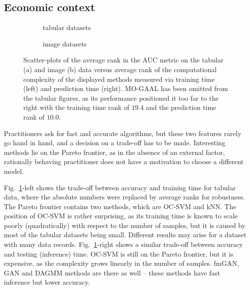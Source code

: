 \subsection{Economic context}
\label{sec:economic_context}
\begin{figure*}
    \centering
    \begin{subfigure}{\columnwidth}
        \centering
        \small
        \resizebox {\linewidth}{!}{
            
        }
        \caption{tabular datasets}
        \label{fig:tabular_total_eval_t_fit_t_combined}
    \end{subfigure}
    \begin{subfigure}{\columnwidth}
        \centering
        \small
        \resizebox {\linewidth}{!}{
            
        }
        \caption{image datasets}
        \label{fig:images_total_eval_t_fit_t_combined}
    \end{subfigure}
    \caption{Scatter-plots of the average rank in the AUC metric on the tabular  (a) and image (b) data versus average rank of the computational complexity of the displayed methods measured via training time (left) and prediction time (right). MO-GAAL has been omitted from the tabular figures, as its performance positioned it too far to the right with the training time rank of $19.4$ and the prediction time rank of $10.0$.}
    \label{fig:images_total_eval_t_fit_t_combined_joined}
\end{figure*}

Practitioners ask for fast and accurate algorithms, but these two features rarely go hand in hand, and a decision on a trade-off has to be made. Interesting methods lie on the Pareto frontier, as in the absence of an external factor, rationally behaving practitioner does not have a motivation to choose a different model.

Fig.~\ref{fig:tabular_total_eval_t_fit_t_combined}-left shows the trade-off between accuracy and training time for tabular data, where the absolute numbers were replaced by average ranks for robustness. The Pareto frontier contains two methods, which are OC-SVM and kNN. The position of OC-SVM is rather surprising, as its training time is known to scale poorly (quadratically) with respect to the number of samples, but it is caused by most of the tabular datasets being small. Different results may arise for a dataset with many data records. Fig.~\ref{fig:tabular_total_eval_t_fit_t_combined}-right shows a similar trade-off between accuracy and testing (inference) time. OC-SVM is still on the Pareto frontier, but it is expensive, as the complexity grows linearly in the number of samples. fmGAN, GAN and DAGMM methods are there as well -- these methods have fast inference but lower accuracy.

